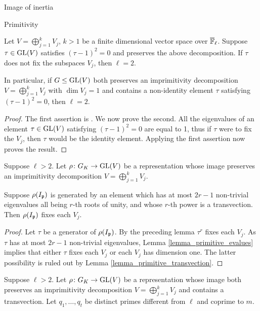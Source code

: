 \documentclass[11pt,a4paper]{article}
\begin{document}
\begin{section}{Image of inertia}
\begin{subsection}{Primitivity}
\begin{lemma}
\label{lemma_primitive_transvection}
Let $V= \bigoplus^k_{j=1} V_j$, $k>1$ be a finite dimensional vector space over ${\overline{\mathbb{F}}_\ell}$. Suppose $\tau \in \GL(V)$ satisfies $(\tau -1)^2 =0$ and preserves the above decomposition.
If $\tau$ does not fix the subspaces $V_j$, then $\ell=2$.

In particular, if $G \leq \GL(V)$ both preserves an imprimitivity  decomposition $V= \bigoplus^k_{j=1} V_j$ with $\dim V_j =1$ and contains a non-identity element $\tau$ satisfying $(\tau -1)^2 =0$, then $\ell =2$.
\end{lemma}

\begin{proof}
The first assertion is \cite[Lemma 4.16]{Anni_VDok}. We now prove the second. All the eigenvalues of an element $\tau \in \GL(V)$ satisfying $(\tau -1)^2 =0$ are equal to 1, thus if $\tau$ were to fix the $V_j$, then $\tau$ would be the identity element. Applying the first assertion now proves the result.
\end{proof}

\begin{corollary}
\label{cor_primitivity_for_almost_transvection}
Suppose $\ell>2$. Let $\rho \colon \GK \rightarrow \GL(V)$ be a representation whose image preserves an imprimitivity  decomposition $V= \bigoplus^k_{j=1} V_j$. 

Suppose $\rho(I_{\mathfrak{p}})$ is generated by an element which has at most $2r-1$ non-trivial eigenvalues all being $r$-th roots of unity, and whose $r$-th power is a transvection.
Then $\rho(I_{\mathfrak{p}})$ fixes each $V_j$. 
\end{corollary}

\begin{proof}
 Let $\tau$ be a generator of $\rho(I_{\mathfrak{p}})$. By the preceding lemma $\tau^r$ fixes each $V_j$.
 As $\tau$ has at most $2r-1$ non-trivial eigenvalues, Lemma \ref{lemma_primitive_evalues} implies that either $\tau$ fixes each $V_j$ or each $V_j$ has dimension one.
 The latter possibility is ruled out by Lemma \ref{lemma_primitive_transvection}.
\end{proof}

\begin{proposition}
\label{prop_primitivity_strict_p_system_and_transvection}
Suppose $\ell>2$. Let $\rho \colon \GK \rightarrow \GL(V)$ be a representation whose image both preserves an imprimitivity  decomposition $V= \bigoplus^k_{j=1} V_j$ and contains a transvection. 
Let $q_1, \ldots, q_t$ be distinct primes different from $\ell$ and coprime to $m$.


\end{proposition}
\end{subsection}
\end{section}
\end{document}
